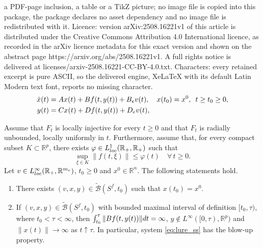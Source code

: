 \documentclass[10pt,a4paper]{amsart}
\newcommand{\R}{\mathbb R}
\newcommand{\sB}{{\mathcal B}}
\begin{document}
a PDF-page inclusion, a table or a TikZ picture; no image file is copied into this package, the package declares no asset dependency and no image file is redistributed with it. Licence: version arXiv:2508.16221v1 of this article is distributed under the Creative Commons Attribution 4.0 International licence, as recorded in the arXiv licence metadata for this exact version and shown on the abstract page https://arxiv.org/abs/2508.16221v1. A full rights notice is delivered at licenses/arxiv-2508.16221-CC-BY-4.0.txt. Characters: every retained excerpt is pure ASCII, so the delivered engine, XeLaTeX with its default Latin Modern text font, reports no missing character.
 \begin{subequations}\label{eq:lure_ss}
 \begin{align}
 \dot x(t) & = Ax(t)+ Bf(t,y(t)) + B_{\rm e}v(t),\quad x(t_0)=x^0,\,\,\,  t\geq t_0\geq 0,
 \label{eq:lure_ss_a}\\
 y(t) & = Cx(t)+Df(t,y(t))+ D_{\rm e}v(t),\label{eq:lure_ss_b}
 \end{align}
 \end{subequations}

\begin{theorem}\label{thm:single_valued}
Assume that $F_t$ is locally injective for every $t\geq 0$ and that
$F_t$ is radially unbounded, locally uniformly in $t$. Furthermore,
assume that, for every compact subset $K\subset\R^p$, there exists
$\varphi\in L^1_{\rm loc}(\R_+,\R_+)$ such that
\begin{equation}\label{eq:single_valued}
\sup_{\xi\in K}\|f(t,\xi)\|\leq\varphi(t)\quad\forall\,t\geq 0.
\end{equation}
Let $v\in L^\infty_{\rm loc}(\R_+,\R^{m_{\rm e}})$, $t_0\geq 0$ and $x^0\in\R^n$. The following statements hold.
%
\begin{enumerate}[label = {\bf (\arabic*)}, ref={\rm (\arabic*)}, leftmargin = 0ex, itemindent = 4.6ex]
\item\label{ls:single_valued_s_1}
There exists $(v,x,y)\in\tilde\sB(S^f,t_0)$ such that $x(t_0)=x^0$.
%
\item\label{ls:single_valued_s_2}
If $(v,x,y)\in\tilde\sB(S^f,t_0)$ with bounded maximal interval of definition $[t_0,\tau)$,
where $t_0<\tau<\infty$, then $\int_{t_0}^\tau\|Bf(t,y(t))\|{\rm d}t=\infty$, $y\not\in L^\infty([0,\tau),\R^p)$ and $\|x(t)\|\to\infty$ as $t\uparrow\tau$. In particular,
system \eqref{eq:lure_ss} has the blow-up property.
%
\end{enumerate}
\end{theorem}
\end{document}
